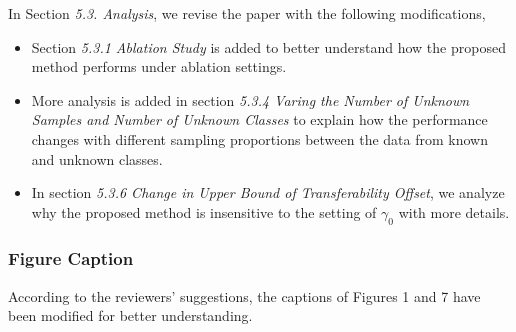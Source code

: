 In Section \textit{5.3. Analysis}, we revise the paper with the following modifications,
\begin{itemize}[topsep=0pt]
    \small
    \item Section \textit{5.3.1 Ablation Study} is added to better understand how the proposed method performs under ablation settings.
    \item More analysis is added in section \textit{5.3.4 Varing the Number of Unknown Samples and Number of Unknown Classes} to explain how the performance changes with different sampling proportions between the data from known and unknown classes.
    \item In section \textit{5.3.6 Change in Upper Bound of Transferability Offset}, we analyze why the proposed method is insensitive to the setting of $\gamma_0$ with more details.
\end{itemize}

\subsubsection*{{\textbf{Figure Caption}}}
According to the reviewers' suggestions, the captions of Figures 1 and 7 have been modified for better understanding.
